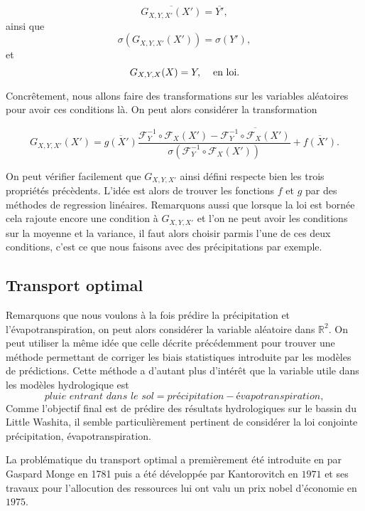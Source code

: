 \documentclass[a4paper,10pt]{article}
\begin{document}
\begin{equation}
	\overline{G_{X,Y,X'}(X')}=\overline{Y'},
\end{equation}
ainsi que
\begin{equation}
	\sigma({G_{X,Y,X'}(X')})=\sigma(Y'),
\end{equation}
et 
\begin{equation}
	G_{X,Y,X}(X)=Y, \hspace{4mm} \textrm{en loi}. 
\end{equation}

Concrêtement, nous allons faire des transformations sur les variables aléatoires pour avoir ces conditions là. On peut alors considérer la transformation 

\[ G_{X,Y,X'} (X')= \overline{g(X')}\frac{\mathcal{F}^{-1}_{Y}\circ\mathcal{F}_{X}(X')- \overline{\mathcal{F}^{-1}_{Y}\circ\mathcal{F}_{X}(X')}}{\sigma(\mathcal{F}^{-1}_{Y}\circ\mathcal{F}_{X}(X'))} + \overline{f(X')}.\]

On peut vérifier facilement que $G_{X,Y,X'}$ ainsi défini respecte bien les trois propriétés précèdents. L'idée est alors de trouver les fonctions $f$ et $g$ par des méthodes de regression linéaires. Remarquons aussi que lorsque la loi est bornée cela rajoute encore une condition à $G_{X,Y,X'}$ et l'on ne peut avoir les conditions sur la moyenne et la variance, il faut alors choisir parmis l'une de ces deux conditions, c'est ce que nous faisons avec des précipitations par exemple.

\subsection{Transport optimal}

Remarquons que nous voulons à la fois prédire la précipitation et l'évapotranspiration, on peut alors considérer la variable aléatoire dans $\mathbb{R}^2$. On peut utiliser la même idée que celle décrite précédemment pour trouver une méthode permettant de corriger les biais statistiques introduite par les modèles de prédictions. Cette méthode a d'autant plus d'intérêt que la variable utile dans les modèles hydrologique est 
\[\textit{pluie entrant dans le sol}=\textit{précipitation}-\textit{évapotranspiration},\]
Comme l'objectif final est de prédire des résultats hydrologiques sur le bassin du Little Washita, il semble particulièrement pertinent de considérer la loi conjointe précipitation, évapotranspiration.

La problématique du transport optimal a premièrement été introduite en par Gaspard Monge en 1781 puis a été développée par Kantorovitch en $1971$ et ses travaux pour l'allocution des ressources lui ont valu un prix nobel d'économie en $1975$.  
\end{document}
